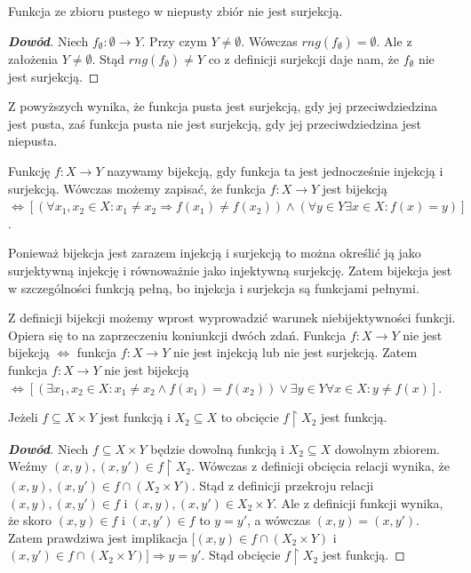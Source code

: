 \begin{property}
Funkcja ze zbioru pustego w niepusty zbiór nie jest surjekcją.
\end{property}
\begin{proof}[\textbf{Dowód}]
Niech $f_{\emptyset}:\emptyset\rightarrow Y$. Przy czym $Y\ne\emptyset$. Wówczas $rng(f_{\emptyset})=\emptyset$. Ale z założenia $Y\ne\emptyset$. Stąd $rng(f_{\emptyset})\ne Y$ co z definicji surjekcji daje nam, że $f_{\emptyset}$ nie jest surjekcją.
\end{proof}
Z powyższych wynika, że funkcja pusta jest surjekcją, gdy jej przeciwdziedzina jest pusta, zaś funkcja pusta nie jest surjekcją, gdy jej przeciwdziedzina jest niepusta.
\begin{definition}
Funkcję $f:X\rightarrow Y$ nazywamy bijekcją, gdy funkcja ta jest jednocześnie injekcją i surjekcją.
Wówczas możemy zapisać, że funkcja $f:X\rightarrow Y$ jest bijekcją $\iff[(\forall x_{1},x_{2}\in X:x_{1}\ne x_{2}\Rightarrow f(x_{1})\ne f(x_{2}))\wedge(\forall y\in Y\exists x\in X:f(x)=y)]$.
\end{definition}
\begin{remark}
Ponieważ bijekcja jest zarazem injekcją i surjekcją to można określić ją jako surjektywną injekcję i równoważnie jako injektywną surjekcję. Zatem bijekcja jest w szczególności funkcją pełną, bo injekcja i surjekcja są funkcjami pełnymi.
\end{remark}
\begin{remark}
Z definicji bijekcji możemy wprost wyprowadzić warunek niebijektywności funkcji. Opiera się to na zaprzeczeniu koniunkcji dwóch zdań. Funkcja $f:X\rightarrow Y$ nie jest bijekcją $\iff$ funkcja $f:X\rightarrow Y$ nie jest injekcją lub nie jest surjekcją. Zatem funkcja $f:X\rightarrow Y$ nie jest bijekcją $\iff[(\exists x_{1},x_{2}\in X: x_{1}\ne x_{2}\wedge f(x_{1})=f(x_{2}))\vee\exists y\in Y\forall x\in X:y\ne f(x)]$.
\end{remark}
\begin{theorem}
Jeżeli $f\subseteq X\times Y$ jest funkcją i $X_{2}\subseteq X$ to obcięcie $f\upharpoonright X_{2}$ jest funkcją.
\end{theorem}
\begin{proof}[\textbf{Dowód}]
Niech $f\subseteq X\times Y$ będzie dowolną funkcją i $X_{2}\subseteq X$ dowolnym zbiorem. Weźmy $(x,y),(x,y')\in f\upharpoonright X_{2}$. Wówczas z definicji obcięcia relacji wynika, że $(x,y),(x,y')\in f\cap(X_{2}\times Y)$. Stąd z definicji przekroju relacji $(x,y),(x,y')\in f$ i $(x,y),(x,y')\in X_{2}\times Y$. Ale z definicji funkcji wynika, że skoro $(x,y)\in f$ i $(x,y')\in f$ to $y=y'$, a wówczas $(x,y)=(x,y')$. Zatem prawdziwa jest implikacja $[(x,y)\in f\cap(X_{2}\times Y)$ i $(x,y')\in f\cap(X_{2}\times Y)]\Rightarrow y=y'$. Stąd obcięcie $f\upharpoonright X_{2}$ jest funkcją.
\end{proof}
